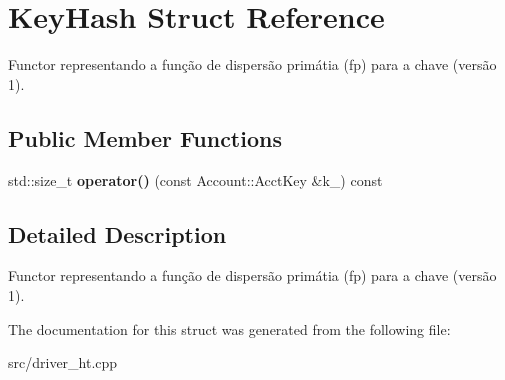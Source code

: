 \hypertarget{structKeyHash}{}\section{Key\+Hash Struct Reference}
\label{structKeyHash}


Functor representando a função de dispersão primátia (fp) para a chave (versão 1).  


\subsection*{Public Member Functions}
\begin{DoxyCompactItemize}
\item 
std\+::size\+\_\+t {\bfseries operator()} (const Account\+::\+Acct\+Key \&k\+\_\+) const \hypertarget{structKeyHash_a3c9441a3123f7bab697f806fde8f13f8}{}\label{structKeyHash_a3c9441a3123f7bab697f806fde8f13f8}

\end{DoxyCompactItemize}


\subsection{Detailed Description}
Functor representando a função de dispersão primátia (fp) para a chave (versão 1). 

The documentation for this struct was generated from the following file\+:\begin{DoxyCompactItemize}
\item 
src/driver\+\_\+ht.\+cpp\end{DoxyCompactItemize}
